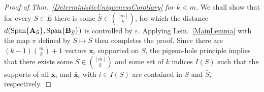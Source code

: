 \documentclass[9pt,twocolumn]{pnas-new}
\begin{document}
\begin{proof}[Proof of Thm.~\ref{DeterministicUniquenessCorollary} for $k < m$] 
We shall show that for every $S \in E$ there is some $\bar S \in {[m] \choose k}$, for which the distance $d(\text{\rm Span}\{\mathbf{A}_S\}, \text{\rm Span}\{\mathbf{B}_{\bar S}\})$ is controlled by $\varepsilon$. Applying Lem.~\ref{MainLemma} with the map $\pi$ defined by $S \mapsto \bar S$ then completes the proof.  Since there are $(k-1){m \choose k}+1$ vectors $\mathbf{x}_i$ supported on $S$, the pigeon-hole principle implies that there exists some $\bar S \in {[m] \choose k}$ and some set of $k$ indices $I(S)$ such that the supports of all $\mathbf{x}_i$ and $\mathbf{\bar x}_i$ with $i \in I(S)$ are contained in $S$ and $\bar S$, respectively.


\end{proof}
\end{document}
